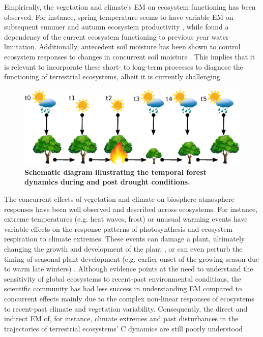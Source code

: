     Empirically, the vegetation and climate's EM on ecosystem functioning has been observed. For instance, spring temperature seems to have variable EM on subsequent summer and autumn ecosystem productivity \citep{CR5}, while \citet{CR6} found a dependency of the current ecosystem functioning to previous year water limitation. Additionally, antecedent soil moisture has been shown to control ecosystem responses to changes in concurrent soil moisture \citep{CR15,CR16}. This implies that it is relevant to incorporate these short- to long-term processes to diagnose the functioning of terrestrial ecosystems, albeit it is currently challenging.  

    \begin{figure}[!ht]
    \centering
    \includegraphics[scale=.6]{figs/Fig1.eps}
    \caption{\textbf{Schematic diagram illustrating the temporal forest dynamics during and post drought conditions.}}
    \label{fig:14.1}
    \end{figure} 

    The concurrent effects of vegetation and climate on biosphere-atmosphere responses have been well observed and described across ecosystems. For instance, extreme temperatures (e.g. heat waves, frost) or unusual warming events have variable effects on the response patterns of photosynthesis and ecosystem respiration to climate extremes. These events can damage a plant, ultimately changing the growth and development of the plant \citep{CR7,CR8,CR9}, or can even perturb the timing of seasonal plant development (e.g. earlier onset of the growing season due to warm late winters) \citep{CR10}. Although evidence points at the need to understand the sensitivity of global ecosystems to recent-past environmental conditions, the scientific community has had less success in understanding EM compared to concurrent effects mainly due to the complex non-linear responses of ecosystems to recent-past climate and vegetation variability. Consequently, the direct and indirect EM of, for instance, climate extremes and past disturbances in the trajectories of terrestrial ecosystems' C dynamics are still poorly understood \citep{CR11}.

